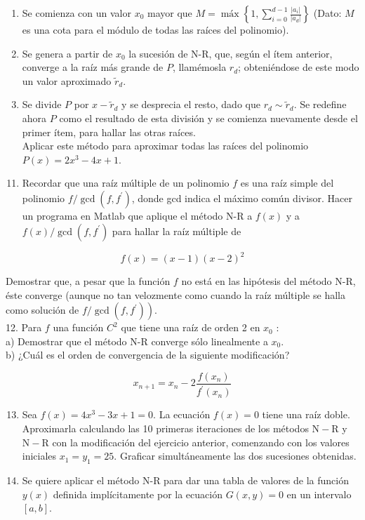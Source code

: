 \documentclass[10pt]{book}
\begin{document}
\begin{enumerate}
  \item Se comienza con un valor $x_{0}$ mayor que $M=\operatorname{máx}\left\{1, \sum_{i=0}^{d-1} \frac{\left|a_{i}\right|}{\left|a_{d}\right|}\right\}$ (Dato: $M$ es una cota para el módulo de todas las raíces del polinomio).
  \item Se genera a partir de $x_{0}$ la sucesión de N-R, que, según el ítem anterior, converge a la raíz más grande de $P$, llamémosla $r_{d}$; obteniéndose de este modo un valor aproximado $\tilde{r}_{d}$.
  \item Se divide $P$ por $x-\tilde{r}_{d}$ y se desprecia el resto, dado que $r_{d} \sim \tilde{r}_{d}$. Se redefine ahora $P$ como el resultado de esta división y se comienza nuevamente desde el primer ítem, para hallar las otras raíces.\\
Aplicar este método para aproximar todas las raíces del polinomio $P(x)=2 x^{3}- 4 x+1$.
\end{enumerate}

\begin{enumerate}
  \setcounter{enumi}{10}
  \item Recordar que una raíz múltiple de un polinomio $f$ es una raíz simple del polinomio $f / \operatorname{gcd}\left(f, f^{\prime}\right)$, donde gcd indica el máximo común divisor. Hacer un programa en Matlab que aplique el método N-R a $f(x)$ y a $f(x) / \operatorname{gcd}\left(f, f^{\prime}\right)$ para hallar la raíz múltiple de
\end{enumerate}

$$
f(x)=(x-1)(x-2)^{2}
$$

Demostrar que, a pesar que la función $f$ no está en las hipótesis del método N-R, éste converge (aunque no tan velozmente como cuando la raíz múltiple se halla como solución de $\left.f / \operatorname{gcd}\left(f, f^{\prime}\right)\right)$.\\
12. Para $f$ una función $C^{2}$ que tiene una raíz de orden 2 en $x_{0}$ :\\
a) Demostrar que el método N-R converge sólo linealmente a $x_{0}$.\\
b) ¿Cuál es el orden de convergencia de la siguiente modificación?

$$
x_{n+1}=x_{n}-2 \frac{f\left(x_{n}\right)}{f^{\prime}\left(x_{n}\right)}
$$

\begin{enumerate}
  \setcounter{enumi}{12}
  \item Sea $f(x)=4 x^{3}-3 x+1=0$. La ecuación $f(x)=0$ tiene una raíz doble. Aproximarla calculando las 10 primeras iteraciones de los métodos $\mathrm{N}-\mathrm{R}$ y $\mathrm{N}-\mathrm{R}$ con la modificación del ejercicio anterior, comenzando con los valores iniciales $x_{1}=y_{1}=25$. Graficar simultáneamente las dos sucesiones obtenidas.
  \item Se quiere aplicar el método N-R para dar una tabla de valores de la función $y(x)$ definida implícitamente por la ecuación $G(x, y)=0$ en un intervalo $[a, b]$.
\end{enumerate}
\end{document}
